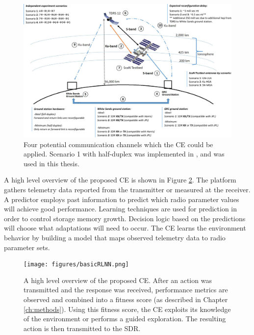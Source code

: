 	\begin{landscape}
	\begin{figure}
		\centering
		\includegraphics[width=\paperwidth]{figures/exampleCommsGoals.png}
		\caption{Four potential communication channels which the CE could be applied. Scenario 1 with half-duplex was implemented in \cite{tim_implementation_paper}, and was used in this thesis.}\label{fig:exampleCommsGoals}
	\end{figure}
	\end{landscape}


	
	\par A high level overview of the proposed CE is shown in Figure \ref{fig:CE_outline}. The platform gathers telemetry data reported from the transmitter or measured at the receiver. A predictor employs past information to predict which radio parameter values will achieve good performance. Learning techniques are used for prediction in order to control storage memory growth. Decision logic based on the predictions will choose what adaptations will need to occur. The CE learns the environment behavior by building a model that maps observed telemetry data to radio parameter sets. 

	\begin{figure}
		\centering
		\texttt{[image: figures/basicRLNN.png]}
		\caption{A high level overview of the proposed CE. After an action was transmitted and the response was received, performance metrics are observed and combined into a fitness score (as described in Chapter \ref{ch:methods}). Using this fitness score, the CE exploits its knowledge of the environment or performs a guided exploration. The resulting action is then transmitted to the SDR.}
		\label{fig:CE_outline}
		
	\end{figure}

